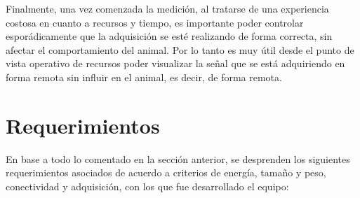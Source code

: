 Finalmente, una vez comenzada la medición, al tratarse de una experiencia costosa en cuanto a recursos y tiempo, es importante poder controlar esporádicamente que la adquisición se esté realizando de forma correcta, sin afectar el comportamiento del animal. Por lo tanto es muy útil desde el punto de vista operativo de recursos poder visualizar la señal que se está adquiriendo en forma remota sin influir en el animal, es decir, de forma remota.


\section{Requerimientos}

En base a todo lo comentado en la sección anterior, se desprenden los siguientes requerimientos asociados de acuerdo a criterios de energía, tamaño y peso, conectividad y adquisición, con los que fue desarrollado el equipo:


